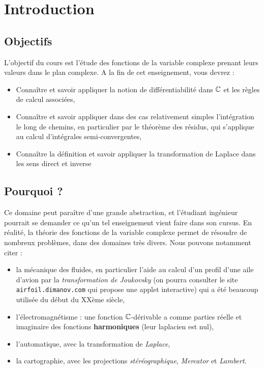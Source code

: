 \chapter*{Introduction}


\section{Objectifs}

L'objectif du cours est l'étude des fonctions de la variable complexe  prenant leurs valeurs dans le plan complexe. A la fin de cet enseignement, vous devrez :
\begin{itemize}
    \item Connaître et savoir appliquer la notion de différentiabilité dans $\mathbb{C}$ et les règles de calcul associées, 
    \item Connaître et savoir appliquer dans des cas relativement simples l'intégration le long de chemins, en particulier par le théorème des résidus, qui s'applique au calcul d'intégrales semi-convergentes, 
    \item Connaître la définition et savoir appliquer la transformation de Laplace dans les sens direct et inverse
\end{itemize}

\section{Pourquoi ?}
Ce domaine peut paraître d'une grande abstraction, et l'étudiant ingénieur pourrait se demander ce qu'un tel enseignement vient faire dans son cursus. En réalité, la théorie des fonctions de la variable complexe permet de résoudre de nombreux problèmes, dans des domaines très divers. Nous pouvons notamment citer :
\begin{itemize}
    \item la mécanique des fluides, en particulier l'aide au calcul d'un profil d'une aile d'avion par la \emph{transformation de Joukovsky} (on pourra consulter le site \linebreak\texttt{airfoil.dimanov.com} 
    qui propose une applet interactive) qui a été beaucoup utilisée du début du XXème siècle,
    \item l'électromagnétisme : une fonction $\mathbb{C}$-dérivable a comme parties réelle et imaginaire des fonctions \textbf{harmoniques} (leur laplacien est nul),
    \item l'automatique, avec la transformation de \emph{Laplace},
    \item la cartographie, avec les projections \emph{stéréographique}, \emph{Mercator} et \emph{Lambert}. 
\end{itemize} 
\vspace{0.1in} 

